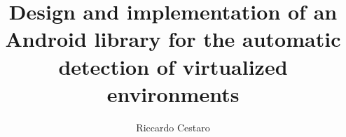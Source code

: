 \title{Design and implementation of an Android library for the automatic detection of virtualized environments}
\author{Riccardo Cestaro}



